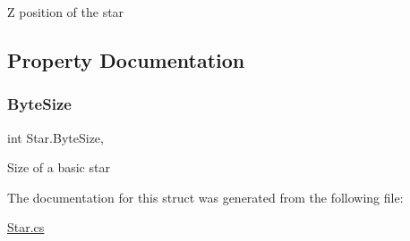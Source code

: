 Z position of the star 



\subsection{Property Documentation}
\mbox{\label{struct_star_ae58cccb7541859c7db676ff74996b98b}} 
\subsubsection{\texorpdfstring{ByteSize}{ByteSize}}
{\footnotesize\ttfamily int Star.\+Byte\+Size\hspace{0.3cm}{\ttfamily [static]}, {\ttfamily [get]}}



Size of a basic star 



The documentation for this struct was generated from the following file\+:\begin{DoxyCompactItemize}
\item 
\mbox{\hyperlink{_star_8cs}{Star.\+cs}}\end{DoxyCompactItemize}
